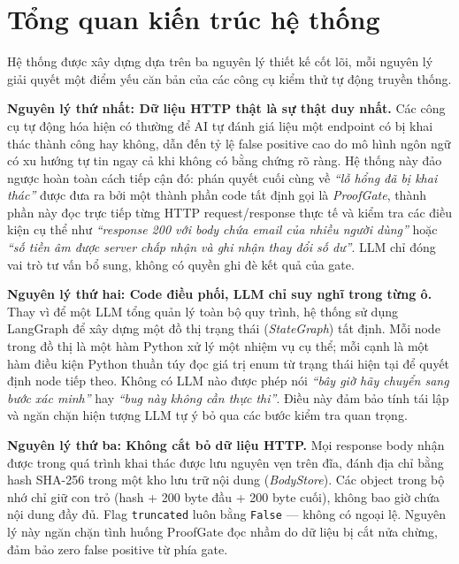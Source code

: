 \section{Tổng quan kiến trúc hệ thống}

Hệ thống được xây dựng dựa trên ba nguyên lý thiết kế cốt lõi, mỗi nguyên lý giải quyết một điểm yếu căn bản của các công cụ kiểm thử tự động truyền thống.

\textbf{Nguyên lý thứ nhất: Dữ liệu HTTP thật là sự thật duy nhất.} Các công cụ tự động hóa hiện có thường để AI tự đánh giá liệu một endpoint có bị khai thác thành công hay không, dẫn đến tỷ lệ false positive cao do mô hình ngôn ngữ có xu hướng tự tin ngay cả khi không có bằng chứng rõ ràng. Hệ thống này đảo ngược hoàn toàn cách tiếp cận đó: phán quyết cuối cùng về \textit{``lỗ hổng đã bị khai thác''} được đưa ra bởi một thành phần code tất định gọi là \textit{ProofGate}, thành phần này đọc trực tiếp từng HTTP request/response thực tế và kiểm tra các điều kiện cụ thể như \textit{``response 200 với body chứa email của nhiều người dùng''} hoặc \textit{``số tiền âm được server chấp nhận và ghi nhận thay đổi số dư''}. LLM chỉ đóng vai trò tư vấn bổ sung, không có quyền ghi đè kết quả của gate.

\textbf{Nguyên lý thứ hai: Code điều phối, LLM chỉ suy nghĩ trong từng ô.} Thay vì để một LLM tổng quản lý toàn bộ quy trình, hệ thống sử dụng LangGraph để xây dựng một đồ thị trạng thái (\textit{StateGraph}) tất định. Mỗi node trong đồ thị là một hàm Python xử lý một nhiệm vụ cụ thể; mỗi cạnh là một hàm điều kiện Python thuần túy đọc giá trị enum từ trạng thái hiện tại để quyết định node tiếp theo. Không có LLM nào được phép nói \textit{``bây giờ hãy chuyển sang bước xác minh''} hay \textit{``bug này không cần thực thi''}. Điều này đảm bảo tính tái lập và ngăn chặn hiện tượng LLM tự ý bỏ qua các bước kiểm tra quan trọng.

\textbf{Nguyên lý thứ ba: Không cắt bỏ dữ liệu HTTP.} Mọi response body nhận được trong quá trình khai thác được lưu nguyên vẹn trên đĩa, đánh địa chỉ bằng hash SHA-256 trong một kho lưu trữ nội dung (\textit{BodyStore}). Các object trong bộ nhớ chỉ giữ con trỏ (hash + 200 byte đầu + 200 byte cuối), không bao giờ chứa nội dung đầy đủ. Flag \texttt{truncated} luôn bằng \texttt{False} --- không có ngoại lệ. Nguyên lý này ngăn chặn tình huống ProofGate đọc nhầm do dữ liệu bị cắt nửa chừng, đảm bảo zero false positive từ phía gate.

